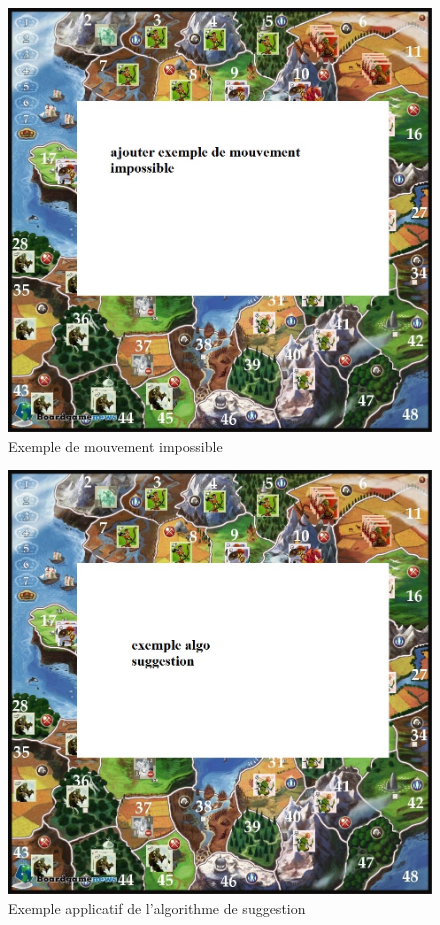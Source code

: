 \newpage
\begin{figure}[ht!]
\centering
\includegraphics[scale=0.40]{img/exmovimp.jpg}
\caption{Exemple de mouvement impossible}
\end{figure}

\newpage
\begin{figure}[ht!]
\centering
\includegraphics[scale=0.40]{img/algo.jpg}
\caption{Exemple applicatif de l'algorithme de suggestion}
\end{figure}

